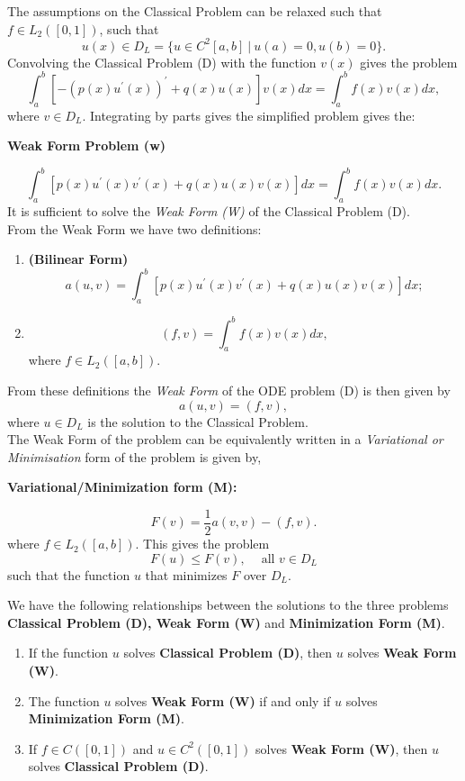 The assumptions on the Classical Problem can be relaxed such that  $f\in L_2([0,1])$,
such that  
\[u(x) \in D_L=\{u \in C^{2}[a,b] \ | \ u(a)=0, u(b)=0 \}. \]
Convolving the Classical Problem (D) with the function $v(x)$ gives the problem 
\[\int_{a}^{b}[-(p(x)u^{'}(x))^{'} + q(x)u(x)]v(x)dx=\int_a^bf(x)v(x)dx, \]
where $v\in D_L$. 
Integrating by parts gives the simplified problem gives the:\\
\begin{center}
\textbf{Weak Form Problem (w)}
\end{center}
\[\int_{a}^{b}[p(x)u^{'}(x)v^{'}(x) + q(x)u(x)v(x)]dx=\int_a^bf(x)v(x)dx. \]
It is sufficient to solve the \textit{Weak Form (W)} of the Classical Problem (D).\\
From the Weak Form we have two definitions:
\begin{enumerate}
    \item \begin{definition}
\textbf{(Bilinear Form)}
\[a(u,v)=\int_{a}^{b}[p(x)u^{'}(x)v^{'}(x) + q(x)u(x)v(x)]dx;\]
\end{definition}
\item
\[(f,v) =\int_{a}^{b}f(x)v(x)dx, \]
where $f\in L_2([a,b])$.

\end{enumerate}
From these definitions the \textit{Weak Form} of the ODE problem (D) is then given by\\
\[a(u,v)=(f,v),\]
where $u\in D_L$ is the solution to the Classical Problem.\\
The Weak Form of the problem can be equivalently written in a  \textit{Variational or Minimisation} form of the problem is given
by,\\ 
\begin{center}
\textbf{Variational/Minimization form (M):}
\end{center} 
\[F(v)=\frac{1}{2}a(v,v)-(f,v).\]
where $f\in L_2([a,b])$. This gives the problem 
\[F(u) \leq F(v), \ \ \ \ \mbox{ all } v\in D_L\]
such that the function $u$ that minimizes $F$ over $D_L$.
\begin{theorem}
We have the following relationships between the solutions to the three problems
\textbf{Classical Problem (D), Weak Form (W)} and \textbf{Minimization Form (M)}.
\begin{enumerate}
\item
If the function $u$ solves \textbf{Classical Problem (D)}, then $u$ solves \textbf{
Weak Form (W)}.
\item
The function $u$ solves \textbf{Weak Form (W)} if and only if $u$ solves \textbf{Minimization Form (M)}.
\item
If $f\in C([0,1])$ and $u \in C^{2}([0,1])$ solves \textbf{Weak Form (W)}, then $u$ solves \textbf{Classical Problem (D)}.
\end{enumerate}
\end{theorem}
